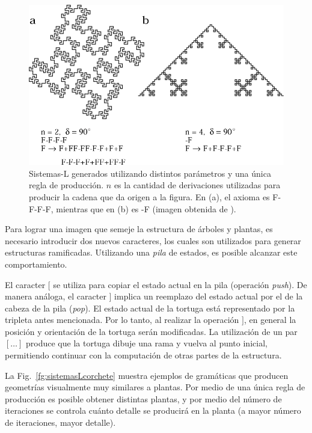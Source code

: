 \begin{figure}
\center
\includegraphics[width=13cm]{figures/sistemasL}
\caption[Sistemas-L generados utilizando distintos parámetros]{Sistemas-L generados utilizando distintos parámetros y una única regla de producción. $n$ es la cantidad de derivaciones utilizadas para producir la cadena que da origen a la figura. En (a), el axioma es F-F-F-F, mientras que en (b) es -F  (imagen obtenida de \cite{Prusinkiewicz1990}).}
\label{fg:sistemasL}
\end{figure}

Para lograr una imagen que semeje la estructura de árboles y plantas, es necesario introducir dos nuevos caracteres, los cuales son utilizados para generar estructuras ramificadas.
Utilizando una {\em pila} de estados, es posible alcanzar este comportamiento.

El caracter $[$ se utiliza para copiar el estado actual en la pila (operación {\em push}).
De manera análoga, el caracter $]$ implica un reemplazo del estado actual por el de la cabeza de la pila ({\em pop}).
El estado actual de la tortuga está representado por la tripleta antes mencionada.
Por lo tanto, al realizar la operación $]$, en general la posición y orientación de la tortuga serán modificadas.
La utilización de un par $[\dots]$ produce que la tortuga dibuje una rama y vuelva al punto inicial, permitiendo continuar con la computación de otras partes de la estructura.

La Fig.~\ref{fg:sistemasLcorchete} muestra ejemplos de gramáticas que producen geometrías visualmente muy similares a plantas.
Por medio de una única regla de producción es posible obtener distintas plantas, y por medio del número de iteraciones se controla cuánto detalle se producirá en la planta (a mayor número de iteraciones, mayor detalle).


